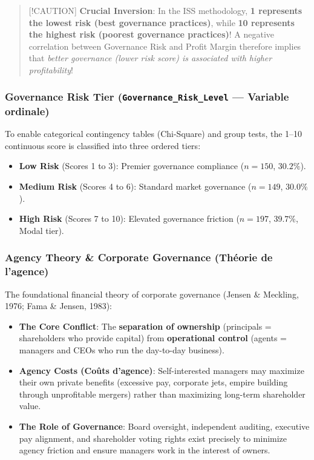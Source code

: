 \documentclass[
]{article}
\providecommand{\tightlist}{%
  \setlength{\itemsep}{0pt}\setlength{\parskip}{0pt}}
\begin{document}
\begin{quote}
{[}!CAUTION{]} \textbf{Crucial Inversion}: In the ISS methodology,
\textbf{1 represents the lowest risk (best governance practices)}, while
\textbf{10 represents the highest risk (poorest governance practices)}!
A negative correlation between Governance Risk and Profit Margin
therefore implies that \emph{better governance (lower risk score) is
associated with higher profitability}!
\end{quote}

\subsubsection{\texorpdfstring{Governance Risk Tier
(\texttt{Governance\_Risk\_Level} --- Variable
ordinale)}{Governance Risk Tier (Governance\_Risk\_Level --- Variable ordinale)}}\label{governance-risk-tier-governance_risk_level-variable-ordinale}

To enable categorical contingency tables (Chi-Square) and group tests,
the 1--10 continuous score is classified into three ordered tiers:

\begin{itemize}
\tightlist
\item
  \textbf{Low Risk} (Scores 1 to 3): Premier governance compliance
  (\(n = 150\), \(30.2\%\)).
\item
  \textbf{Medium Risk} (Scores 4 to 6): Standard market governance
  (\(n = 149\), \(30.0\%\)).
\item
  \textbf{High Risk} (Scores 7 to 10): Elevated governance friction
  (\(n = 197\), \(39.7\%\), Modal tier).
\end{itemize}

\subsubsection{Agency Theory \& Corporate Governance (Théorie de
l'agence)}\label{agency-theory-corporate-governance-thuxe9orie-de-lagence}

The foundational financial theory of corporate governance (Jensen \&
Meckling, 1976; Fama \& Jensen, 1983):

\begin{itemize}
\tightlist
\item
  \textbf{The Core Conflict}: The \textbf{separation of ownership}
  (principals = shareholders who provide capital) from
  \textbf{operational control} (agents = managers and CEOs who run the
  day-to-day business).
\item
  \textbf{Agency Costs (Coûts d'agence)}: Self-interested managers may
  maximize their own private benefits (excessive pay, corporate jets,
  empire building through unprofitable mergers) rather than maximizing
  long-term shareholder value.
\item
  \textbf{The Role of Governance}: Board oversight, independent
  auditing, executive pay alignment, and shareholder voting rights exist
  precisely to minimize agency friction and ensure managers work in the
  interest of owners.
\end{itemize}
\end{document}
